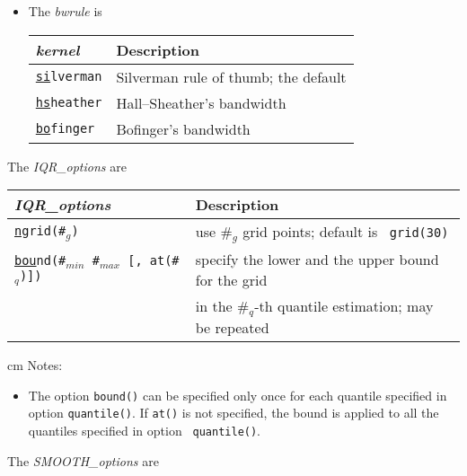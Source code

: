 \begin{itemize}
\item The {\it bwrule} is

\begin{tabular}{ll}
\hline
{\it kernel} & Description \\
\hline
{\tt \underline{si}lverman} & Silverman rule of thumb; the default \\
{\tt \underline{hs}heather} & Hall–Sheather’s bandwidth \\
{\tt \underline{bo}finger} & Bofinger’s bandwidth \\
\hline
\end{tabular}

\end{itemize}

\vskip 0.5cm
\noindent
The {\it IQR\_options} are
\vskip 0.5cm

\begin{tabular}{ll}
\hline
{\it IQR\_options} & Description\\
\hline
{\tt \underline{ng}rid(\#$_g$)} & use \#$_g$ grid points; default is {\tt
grid(30)} \\
{\tt \underline{bou}nd(\#$_{min}$ \#$_{max}$ [, at(\#$_{q}$)])} &
specify the lower and the upper bound for the grid \\
& in the \#$_{q}$-th quantile estimation; may be repeated \\
\hline
\end{tabular}

 cm
Notes:
\begin{itemize}
 
  \item The option {\tt bound()} can be specified only once for each quantile
    specified in option {\tt quantile()}. If {\tt at()} is not specified, the
    bound is applied to all the quantiles specified in option {\tt
    quantile()}.

\end{itemize}

\vskip 0.5cm
\noindent
The {\it SMOOTH\_options} are
\vskip 0.5cm

